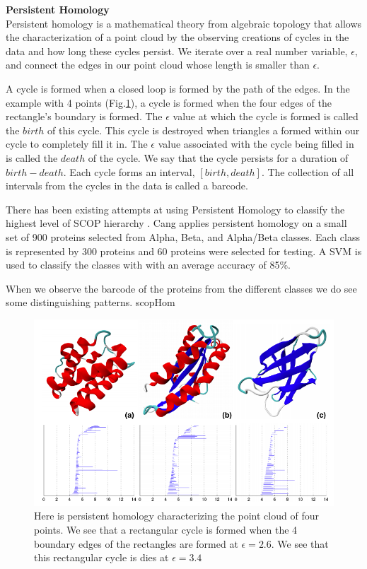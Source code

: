 \documentclass[12pt, a4paper, twocolumn, fullpage]{article}
\theoremstyle{plain}
\theoremstyle{definition}
\theoremstyle{remark}
\begin{document}
\textbf{Persistent Homology}  \\
Persistent homology is a mathematical theory from algebraic topology that allows the characterization of a point cloud by the observing creations of cycles in the data and how long these cycles persist. We iterate over a real number variable, $\epsilon$, and connect the edges in our point cloud whose length is smaller than $\epsilon$. 

A cycle is formed when a closed loop is formed by the path of the edges. In the example with 4 points (Fig.\ref{fig:persistentHomEx}), a cycle is formed when the four edges of the rectangle's boundary is formed. The $\epsilon$ value at which the cycle is formed is called the $birth$ of this cycle. This cycle is destroyed when triangles a formed within our cycle to completely fill it in. The $\epsilon$ value associated with the cycle being filled in is called the $death$ of the cycle. We say that the cycle persists for a duration of $birth-death$. Each cycle forms an interval, $[birth, death]$. The collection of all intervals from the cycles in the data is called a barcode.

There has been existing attempts at using Persistent Homology to classify the highest level of SCOP hierarchy \cite{SCOPHom}. Cang applies persistent homology on a small set of 900 proteins selected from Alpha, Beta, and Alpha/Beta classes. Each class is represented by 300 proteins and 60 proteins were selected for testing. A SVM is used to classify the classes with with an average accuracy of 85\%. 

When we observe the barcode of the proteins from the different classes we do see some distinguishing patterns.
scopHom
\begin{figure}
	\centering
    \includegraphics[width=\linewidth]{img/hom/scopHom.png}
    \caption{Here is persistent homology characterizing the point cloud of four points. We see that a rectangular cycle is formed when the 4 boundary edges of the rectangles are formed at $\epsilon = 2.6$. We see that this rectangular cycle is dies at   $\epsilon = 3.4$}
    \label{fig:persistentHomEx}
\end{figure}
\end{document}
